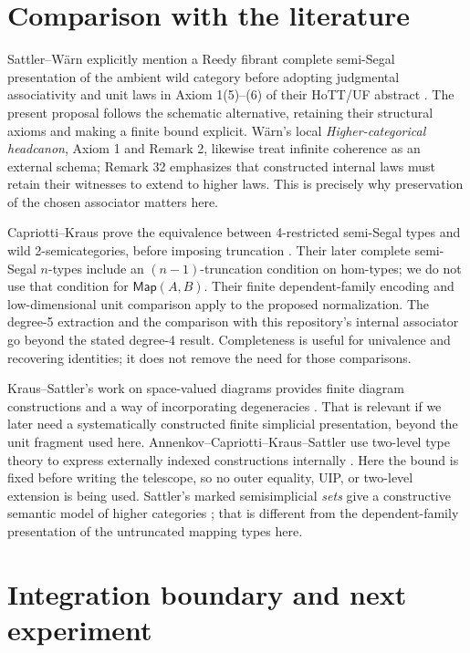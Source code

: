 \documentclass[11pt]{amsart}
\newcommand{\Map}{\mathsf{Map}}
\theoremstyle{definition}
\begin{document}
\section{Comparison with the literature}

Sattler--W\"arn explicitly mention a Reedy fibrant complete semi-Segal
presentation of the ambient wild category before adopting judgmental
associativity and unit laws in Axiom 1(5)--(6) of their HoTT/UF abstract
\cite{sw}. The present proposal follows the schematic alternative,
retaining their structural axioms and making a finite bound explicit.
W\"arn's local \emph{Higher-categorical headcanon}, Axiom 1 and Remark 2,
likewise treat infinite coherence as an external schema; Remark 32
emphasizes that constructed internal laws must retain their witnesses
to extend to higher laws. This is precisely why preservation of the
chosen associator matters here.

Capriotti--Kraus prove the equivalence between 4-restricted semi-Segal
types and wild 2-semicategories, before imposing truncation
\cite[Theorem 3.6]{ck}. Their later complete semi-Segal $n$-types
include an $(n-1)$-truncation condition on hom-types; we do not use that
condition for $\Map(A,B)$. Their finite dependent-family encoding and
low-dimensional unit comparison apply to the proposed normalization.
The degree-5 extraction and the comparison with this repository's
internal associator go beyond the stated degree-4 result. Completeness
is useful for univalence and recovering identities; it does not remove
the need for those comparisons.

Kraus--Sattler's work on space-valued diagrams provides finite diagram
constructions and a way of incorporating degeneracies \cite{ks}.
That is relevant if we later need a systematically constructed finite
simplicial presentation, beyond the unit fragment used here.
Annenkov--Capriotti--Kraus--Sattler use two-level type theory to express
externally indexed constructions internally \cite{twolevel}. Here the
bound is fixed before writing the telescope, so no outer equality,
UIP, or two-level extension is being used.
Sattler's marked semisimplicial \emph{sets} give a constructive semantic
model of higher categories \cite{sattler}; that is different from the
dependent-family presentation of the untruncated mapping types here.

\section{Integration boundary and next experiment}
\end{document}
